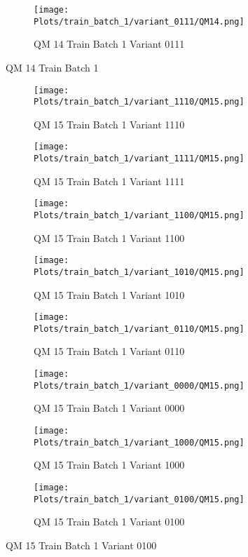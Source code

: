 \documentclass{DissertateFigs}
\begin{document}
\begin{figure}[t!]
\medskip

    \begin{subfigure}{0.47\textwidth}
    \texttt{[image: Plots/train\_batch\_1/variant\_0111/QM14.png]}
    \caption{QM 14 Train Batch 1 Variant 0111}
    \end{subfigure}
\caption{QM 14 Train Batch 1}
    \end{figure}
\clearpage
\begin{figure}[t!]
    \begin{subfigure}{0.32\textwidth}
    \texttt{[image: Plots/train\_batch\_1/variant\_1110/QM15.png]}
    \caption{QM 15 Train Batch 1 Variant 1110}
    \end{subfigure}
    \begin{subfigure}{0.32\textwidth}
    \texttt{[image: Plots/train\_batch\_1/variant\_1111/QM15.png]}
    \caption{QM 15 Train Batch 1 Variant 1111}
    \end{subfigure}

\medskip

    \begin{subfigure}{0.32\textwidth}
    \texttt{[image: Plots/train\_batch\_1/variant\_1100/QM15.png]}
    \caption{QM 15 Train Batch 1 Variant 1100}
    \end{subfigure}
    \begin{subfigure}{0.32\textwidth}
    \texttt{[image: Plots/train\_batch\_1/variant\_1010/QM15.png]}
    \caption{QM 15 Train Batch 1 Variant 1010}
    \end{subfigure}

\medskip

    \begin{subfigure}{0.32\textwidth}
    \texttt{[image: Plots/train\_batch\_1/variant\_0110/QM15.png]}
    \caption{QM 15 Train Batch 1 Variant 0110}
    \end{subfigure}
    \begin{subfigure}{0.32\textwidth}
    \texttt{[image: Plots/train\_batch\_1/variant\_0000/QM15.png]}
    \caption{QM 15 Train Batch 1 Variant 0000}
    \end{subfigure}

\medskip

    \begin{subfigure}{0.32\textwidth}
    \texttt{[image: Plots/train\_batch\_1/variant\_1000/QM15.png]}
    \caption{QM 15 Train Batch 1 Variant 1000}
    \end{subfigure}
    \begin{subfigure}{0.32\textwidth}
    \texttt{[image: Plots/train\_batch\_1/variant\_0100/QM15.png]}
    \caption{QM 15 Train Batch 1 Variant 0100}
    \end{subfigure}


\end{figure}
\end{document}
